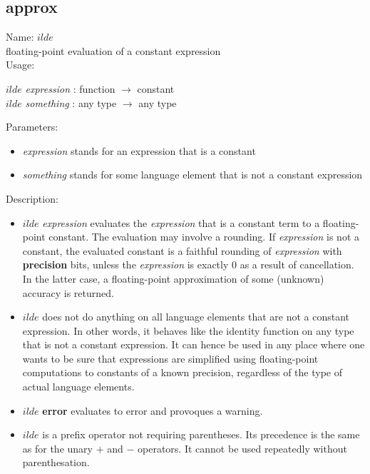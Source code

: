 \subsection{approx}
\label{labapprox}
\noindent Name: \textbf{$	ilde$}\\
floating-point evaluation of a constant expression\\

\noindent Usage: 
\begin{center}
\textbf{$	ilde$} \emph{expression} : \textsf{function} $\rightarrow$ \textsf{constant}\\
\textbf{$	ilde$} \emph{something} : \textsf{any type} $\rightarrow$ \textsf{any type}\\
\end{center}
Parameters: 
\begin{itemize}
\item \emph{expression} stands for an expression that is a constant
\item \emph{something} stands for some language element that is not a constant expression
\end{itemize}
\noindent Description: \begin{itemize}

\item \textbf{$	ilde$} \emph{expression} evaluates the \emph{expression} that is a constant
   term to a floating-point constant. The evaluation may involve a
   rounding. If \emph{expression} is not a constant, the evaluated constant is
   a faithful rounding of \emph{expression} with \textbf{precision} bits, unless the
   \emph{expression} is exactly $0$ as a result of cancellation. In the
   latter case, a floating-point approximation of some (unknown) accuracy
   is returned.

\item \textbf{$	ilde$} does not do anything on all language elements that are not a
   constant expression.  In other words, it behaves like the identity
   function on any type that is not a constant expression. It can hence
   be used in any place where one wants to be sure that expressions are
   simplified using floating-point computations to constants of a known
   precision, regardless of the type of actual language elements.

\item \textbf{$	ilde$} \textbf{error} evaluates to error and provoques a warning.

\item \textbf{$	ilde$} is a prefix operator not requiring parentheses. Its
   precedence is the same as for the unary $+$ and $-$
   operators. It cannot be used repeatedly without parenthesation.
\end{itemize}
